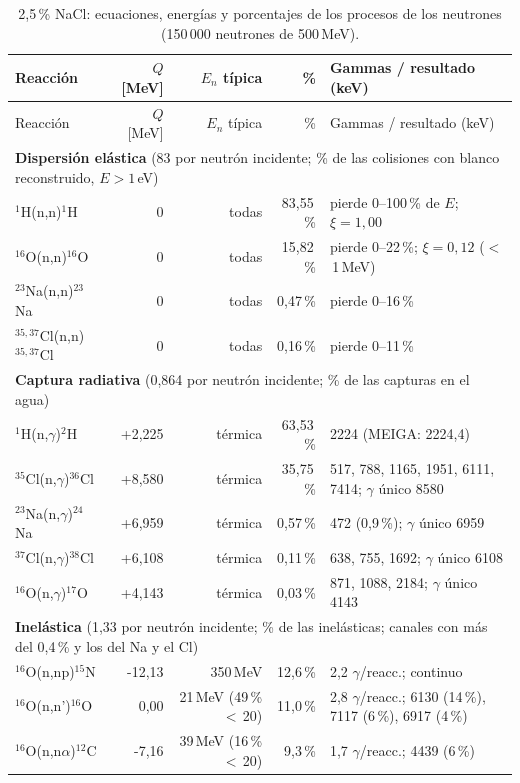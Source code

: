 \documentclass[11pt,a4paper]{article}
\begin{document}
{\footnotesize\begin{longtable}{p{4.4cm}rrrp{4.6cm}}
\caption{2,5\,\% NaCl: ecuaciones, energías y porcentajes de los procesos de los neutrones (150\,000 neutrones de 500\,MeV).}\label{tab:procesos_nacl25}\\\toprule
Reacción & $Q$ [MeV] & $E_n$ típica & \% & Gammas / resultado (keV) \\\midrule\endfirsthead
\toprule Reacción & $Q$ [MeV] & $E_n$ típica & \% & Gammas / resultado (keV) \\\midrule\endhead
\multicolumn{5}{l}{\textbf{Dispersión elástica} (83 por neutrón incidente; \% de las colisiones con blanco reconstruido, $E>1$\,eV)}\\
$^1$H(n,n)$^1$H & 0 & todas & 83,55\,\% & pierde 0--100\,\% de $E$; $\xi = 1{,}00$ \\
$^{16}$O(n,n)$^{16}$O & 0 & todas & 15,82\,\% & pierde 0--22\,\%; $\xi = 0{,}12$ ($<$\,1\,MeV) \\
$^{23}$Na(n,n)$^{23}$Na & 0 & todas & 0,47\,\% & pierde 0--16\,\% \\
$^{35,37}$Cl(n,n)$^{35,37}$Cl & 0 & todas & 0,16\,\% & pierde 0--11\,\% \\
\midrule\multicolumn{5}{l}{\textbf{Captura radiativa} (0,864 por neutrón incidente; \% de las capturas en el agua)}\\
$^1$H(n,$\gamma$)$^2$H & +2,225 & térmica & 63,53\,\% & 2224 (MEIGA: 2224,4) \\
$^{35}$Cl(n,$\gamma$)$^{36}$Cl & +8,580 & térmica & 35,75\,\% & 517, 788, 1165, 1951, 6111, 7414; $\gamma$ único 8580 \\
$^{23}$Na(n,$\gamma$)$^{24}$Na & +6,959 & térmica & 0,57\,\% & 472 (0,9\,\%); $\gamma$ único 6959 \\
$^{37}$Cl(n,$\gamma$)$^{38}$Cl & +6,108 & térmica & 0,11\,\% & 638, 755, 1692; $\gamma$ único 6108 \\
$^{16}$O(n,$\gamma$)$^{17}$O & +4,143 & térmica & 0,03\,\% & 871, 1088, 2184; $\gamma$ único 4143 \\
\midrule\multicolumn{5}{l}{\textbf{Inelástica} (1,33 por neutrón incidente; \% de las inelásticas; canales con más del 0,4\,\% y los del Na y el Cl)}\\
$^{16}$O(n,np)$^{15}$N & -12,13 & 350\,MeV & 12,6\,\% & 2,2 $\gamma$/reacc.; continuo \\
$^{16}$O(n,n')$^{16}$O & 0,00 & 21\,MeV (49\,\% $<$\,20) & 11,0\,\% & 2,8 $\gamma$/reacc.; 6130 (14\,\%), 7117 (6\,\%), 6917 (4\,\%) \\
$^{16}$O(n,n$\alpha$)$^{12}$C & -7,16 & 39\,MeV (16\,\% $<$\,20) & 9,3\,\% & 1,7 $\gamma$/reacc.; 4439 (6\,\%) \\

\end{longtable}}
\end{document}
